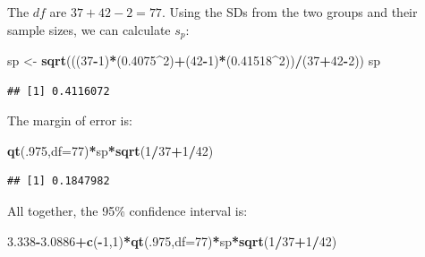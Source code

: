 \documentclass[]{book}
\newenvironment{Shaded}{\begin{snugshade}}{\end{snugshade}}
\newcommand{\KeywordTok}[1]{\textcolor[rgb]{0.13,0.29,0.53}{\textbf{#1}}}
\newcommand{\DataTypeTok}[1]{\textcolor[rgb]{0.13,0.29,0.53}{#1}}
\newcommand{\DecValTok}[1]{\textcolor[rgb]{0.00,0.00,0.81}{#1}}
\newcommand{\FloatTok}[1]{\textcolor[rgb]{0.00,0.00,0.81}{#1}}
\newcommand{\StringTok}[1]{\textcolor[rgb]{0.31,0.60,0.02}{#1}}
\newcommand{\OperatorTok}[1]{\textcolor[rgb]{0.81,0.36,0.00}{\textbf{#1}}}
\newcommand{\NormalTok}[1]{#1}
\theoremstyle{definition}
\theoremstyle{definition}
\theoremstyle{remark}
\begin{document}
The \(df\) are \(37+42-2 = 77\). Using the SDs from the two groups and
their sample sizes, we can calculate \(s_p\):

\begin{Shaded}
\begin{Highlighting}[]
\NormalTok{sp <-}\StringTok{ }\KeywordTok{sqrt}\NormalTok{(((}\DecValTok{37}\OperatorTok{-}\DecValTok{1}\NormalTok{)}\OperatorTok{*}\NormalTok{(}\FloatTok{0.4075}\OperatorTok{^}\DecValTok{2}\NormalTok{)}\OperatorTok{+}\NormalTok{(}\DecValTok{42}\OperatorTok{-}\DecValTok{1}\NormalTok{)}\OperatorTok{*}\NormalTok{(}\FloatTok{0.41518}\OperatorTok{^}\DecValTok{2}\NormalTok{))}\OperatorTok{/}\NormalTok{(}\DecValTok{37}\OperatorTok{+}\DecValTok{42}\OperatorTok{-}\DecValTok{2}\NormalTok{))}
\NormalTok{sp}
\end{Highlighting}
\end{Shaded}

\begin{verbatim}
## [1] 0.4116072
\end{verbatim}

The margin of error is:

\begin{Shaded}
\begin{Highlighting}[]
\KeywordTok{qt}\NormalTok{(.}\DecValTok{975}\NormalTok{,}\DataTypeTok{df=}\DecValTok{77}\NormalTok{)}\OperatorTok{*}\NormalTok{sp}\OperatorTok{*}\KeywordTok{sqrt}\NormalTok{(}\DecValTok{1}\OperatorTok{/}\DecValTok{37}\OperatorTok{+}\DecValTok{1}\OperatorTok{/}\DecValTok{42}\NormalTok{)}
\end{Highlighting}
\end{Shaded}

\begin{verbatim}
## [1] 0.1847982
\end{verbatim}

All together, the 95\% confidence interval is:

\begin{Shaded}
\begin{Highlighting}[]
\FloatTok{3.338}\OperatorTok{-}\FloatTok{3.0886}\OperatorTok{+}\KeywordTok{c}\NormalTok{(}\OperatorTok{-}\DecValTok{1}\NormalTok{,}\DecValTok{1}\NormalTok{)}\OperatorTok{*}\KeywordTok{qt}\NormalTok{(.}\DecValTok{975}\NormalTok{,}\DataTypeTok{df=}\DecValTok{77}\NormalTok{)}\OperatorTok{*}\NormalTok{sp}\OperatorTok{*}\KeywordTok{sqrt}\NormalTok{(}\DecValTok{1}\OperatorTok{/}\DecValTok{37}\OperatorTok{+}\DecValTok{1}\OperatorTok{/}\DecValTok{42}\NormalTok{)}
\end{Highlighting}
\end{Shaded}
\end{document}
